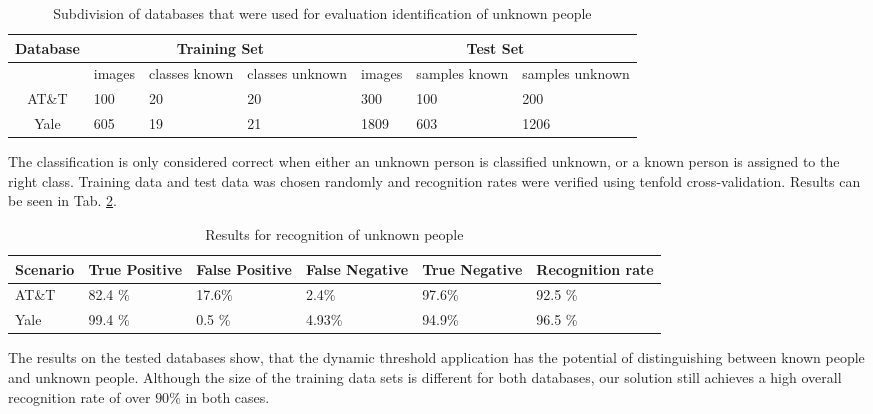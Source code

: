 \begin{table}[htbp]
  \centering
  \caption{Subdivision of databases that were used for evaluation identification of unknown people}
  \label{tab:EvalUnknownDivision}
  \begin{tabular}{c|p{0.8cm}|p{0.8cm}|p{0.8cm}|p{0.8cm}|p{0.8cm}|p{0.8cm}}
    Database&\multicolumn{3}{|c|}{Training Set}&\multicolumn{3}{|c}{Test Set}\\
    \hline
    &images & classes known & classes unknown& images & samples known & samples unknown\\
    \hline
    AT\&T &100 & 20 &20 & 300 & 100 & 200\\
    Yale & 605 & 19 &21 & 1809 & 603 &1206\\
  \end{tabular}
\end{table}

The classification is only considered correct when either an unknown person is classified unknown, or a known person is assigned to the right class.
Training data and test data was chosen randomly and recognition rates were verified using tenfold cross-validation.
Results can be seen in Tab. \ref{tab:EvalUnknownThreshold}.


\begin{table}[htbp]
  \centering
  \caption{Results for recognition of unknown people}
  \label{tab:EvalUnknownThreshold}
  \begin{tabular}{l|p{0.8cm}|p{0.8cm}|p{0.8cm}|p{0.8cm}|p{0.9cm}}
    Scenario & True \newline Positive & False \newline Positive & False \newline Negative & True \newline Negative  &   Recognition rate\\
    \hline
    AT\&T &82.4 \%  & 17.6\% & 2.4\% & 97.6\%& 92.5 \% \\
    Yale & 99.4 \%& 0.5 \%& 4.93\% & 94.9\% & 96.5 \% \\
  \end{tabular}
\end{table}
The results on the tested databases show, that the dynamic threshold application has the potential of distinguishing between known people and unknown people.
Although the size of the training data sets is different for both databases, our solution still achieves a high overall recognition rate of over $90 \%$ in both cases.

